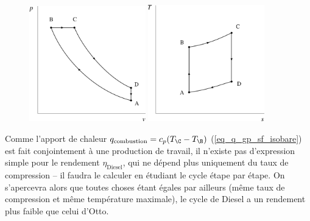 		\begin{figure}
			\begin{center}
				\includegraphics[width=0.45\textwidth]{images/pv_gp_diesel.png}
				\includegraphics[width=0.45\textwidth]{images/ts_gp_diesel.png}
			\end{center}
			\label{fig_cycle_diesel}
		\end{figure}

		Comme l’apport de chaleur $q_\text{combustion} = c_p (T_\C - T_\B)$ (\ref{eq_q_gp_sf_isobare}) est fait conjointement à une production de travail, il n’existe pas d’expression simple pour le rendement $\eta_\text{Diesel}$, qui ne dépend plus uniquement du taux de compression -- il faudra le calculer en étudiant le cycle étape par étape. On s’apercevra alors que toutes choses étant égales par ailleurs (même taux de compression et même température maximale), le cycle de Diesel a un rendement plus faible que celui d’Otto. 
		
